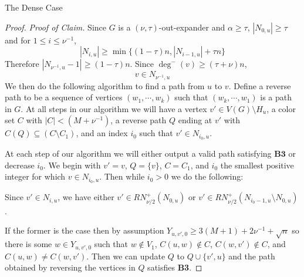 \documentclass[11pt,a4paper]{article}
\begin{document}
\begin{section}{The Dense Case}
\begin{proof}
\textit{Proof of Claim.} Since $G$ is a $(\nu, \tau)$-out-expander and $\alpha \geq \tau$, $|N_{0, u}| \geq \tau$ and for $1 \leq i \leq \nu^{-1}$,
\[
|N_{i, u}| \geq \min \{ (1 - \tau)n, |N_{i - 1, u} | + \tau n \}
\]
Therefore $|N_{\nu^{-1}, u} - 1| \geq (1 - \tau) n$. Since $ \deg^- (v) \geq (\tau + \nu) n$,
\[
v \in  N_{\nu^{-1}, u} 
\]
We then do the following algorithm to find a path from $u$ to $v$. Define a reverse path to be a sequence of vertices $(w_1, \cdots, w_k)$ such that $(w_k, \cdots, w_1)$ is a path in $G$. At all steps in our algorithm we will have a vertex $v' \in V(G) \setminus H_{u}$, a color set $C$ with $|C| < (M + \nu^{-1})$, a reverse path $Q$ ending at $v'$ with $C(Q) \subseteq (C \setminus C_1)$, and an index $i_0$ such that $v' \in N_{i_0, u}$.

\medskip

At each step of our algorithm we will either output a valid path satisfying $\textbf{B3}$ or decrease $i_0$. We begin with $v' = v$, $Q = \{v\}$, $C = C_1$, and $i_0$ the smallest positive integer for which $v \in N_{i_0, u}$. Then while $i_0 > 0$ we do the following:

\medskip

Since $v' \in N_{i, u}$, we have either $v' \in RN^+_{\nu/2} (N_{0, u} )$ or $v' \in RN^+_{\nu/2} ( N_{i_0 - 1, u} \setminus N_{0, u} )$.

\medskip

If the former is the case then by assumption $Y_{u, v', 0} \geq 3(M + 1) + 2\nu^{-1} + \sqrt n$ so there is some $w \in Y_{u, v', 0}$ such that $w \not \in V_1$, $C(u, w) \not \in C$, $C(w, v') \not \in C$, and $C(u, w) \neq C(w, v')$. Then we can update $Q$ to $Q \cup \{v', u\}$ and the path obtained by reversing the vertices in $Q$ satisfies \textbf{B3}.

\medskip 


\end{proof}
\end{section}
\end{document}
